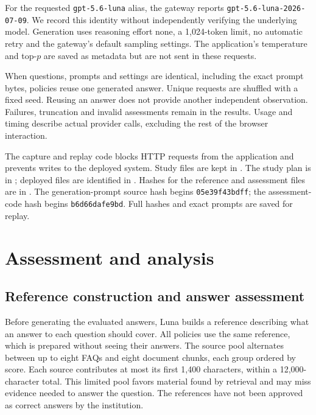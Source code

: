 \documentclass[a4paper,10pt,twocolumn]{article}
\begin{document}
For the requested \texttt{gpt-5.6-luna} alias, the gateway reports \texttt{gpt-5.6-luna-2026-07-09}. We record this identity without independently verifying the underlying model. Generation uses reasoning effort none, a 1,024-token limit, no automatic retry and the gateway's default sampling settings. The application's temperature and top-$p$ are saved as metadata but are not sent in these requests.

When questions, prompts and settings are identical, including the exact prompt bytes, policies reuse one generated answer. Unique requests are shuffled with a fixed seed. Reusing an answer does not provide another independent observation. Failures, truncation and invalid assessments remain in the results. Usage and timing describe actual provider calls, excluding the rest of the browser interaction.

The capture and replay code blocks HTTP requests from the application and prevents writes to the deployed system. Study files are kept in . The study plan is in ; deployed files are identified in . Hashes for the reference and assessment files are in . The generation-prompt source hash begins \texttt{05e39f43bdff}; the assessment-code hash begins \texttt{b6d66dafe9bd}. Full hashes and exact prompts are saved for replay.

\section{Assessment and analysis}
\subsection{Reference construction and answer assessment}
Before generating the evaluated answers, Luna builds a reference describing what an answer to each question should cover. All policies use the same reference, which is prepared without seeing their answers. The source pool alternates between up to eight FAQs and eight document chunks, each group ordered by score. Each source contributes at most its first 1,400 characters, within a 12,000-character total. This limited pool favors material found by retrieval and may miss evidence needed to answer the question. The references have not been approved as correct answers by the institution.
\end{document}
